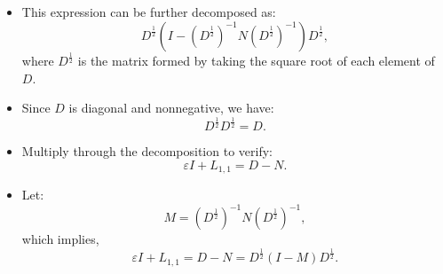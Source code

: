 \documentclass[aspectratio=169]{beamer}
\begin{document}
\begin{frame}
    

\begin{itemize}

  \item This expression can be further decomposed as:
  \[
  D^{\frac{1}{2}} \left( I - (D^{\frac{1}{2}})^{-1} N (D^{\frac{1}{2}})^{-1} \right) D^{\frac{1}{2}},
  \]
  where \( D^{\frac{1}{2}} \) is the matrix formed by taking the square root of each element of \( D \).

  \item Since \( D \) is diagonal and nonnegative, we have:
  \[
  D^{\frac{1}{2}} D^{\frac{1}{2}} = D.
  \]

  \item Multiply through the decomposition to verify:
  \[
  \varepsilon I + L_{1,1} = D - N.
  \]

  \item Let:
  \[
  M = (D^{\frac{1}{2}})^{-1} N (D^{\frac{1}{2}})^{-1},
  \]
  which implies,
  \[
  \varepsilon I + L_{1,1} = D - N = D^{\frac{1}{2}} (I - M) D^{\frac{1}{2}}.
  \]
\end{itemize}

\end{frame}
\end{document}
